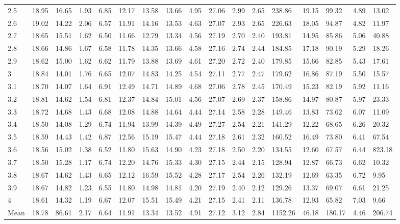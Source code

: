 \begin{adjustbox}{angle=90}
\begin{center}
\begin{tabular}{|l|llllllllllllllll|}
2.5&18.95&16.65&1.93&6.85&12.17&13.58&13.66&4.95&27.06&2.99&2.65&238.86&19.15&99.32&4.89&13.02  \\ 
2.6&19.02&14.22&2.06&6.57&11.91&14.16&13.53&4.63&27.07&2.93&2.65&226.63&18.05&94.87&4.82&11.97  \\ 
2.7&18.65&15.51&1.62&6.50&11.66&12.79&13.34&4.56&27.19&2.70&2.40&193.81&14.95&85.86&5.06&40.88  \\ 
2.8&18.66&14.86&1.67&6.58&11.78&14.35&13.66&4.58&27.16&2.74&2.44&184.85&17.18&90.19&5.29&18.26  \\ 
2.9&18.62&15.00&1.62&6.62&11.79&13.88&13.69&4.61&27.20&2.72&2.40&179.85&15.66&82.85&5.43&17.61  \\ 
3&18.84&14.01&1.76&6.65&12.07&14.83&14.25&4.54&27.11&2.77&2.47&179.62&16.86&87.19&5.50&15.57  \\ 
3.1&18.70&14.07&1.64&6.91&12.49&14.71&14.89&4.68&27.06&2.78&2.45&170.49&15.23&82.19&5.92&11.16  \\ 
3.2&18.81&14.62&1.54&6.81&12.37&14.84&15.01&4.56&27.07&2.69&2.37&158.86&14.97&80.87&5.97&23.33  \\ 
3.3&18.72&14.68&1.43&6.68&12.08&14.88&14.64&4.44&27.14&2.58&2.28&149.46&13.83&73.62&6.07&11.09  \\ 
3.4&18.50&14.08&1.29&6.74&11.94&13.99&14.39&4.49&27.27&2.54&2.21&141.29&12.22&68.65&6.26&20.32  \\ 
3.5&18.59&14.43&1.42&6.87&12.56&15.19&15.47&4.44&27.18&2.61&2.32&160.52&16.49&73.80&6.41&67.54  \\ 
3.6&18.56&15.02&1.38&6.52&11.80&15.63&14.90&4.23&27.18&2.50&2.20&134.55&12.60&67.57&6.44&823.18  \\ 
3.7&18.50&15.28&1.17&6.74&12.20&14.76&15.33&4.30&27.15&2.44&2.15&128.94&12.87&66.73&6.62&10.32  \\ 
3.8&18.67&14.62&1.43&6.65&12.12&16.59&15.52&4.28&27.17&2.54&2.26&132.19&12.69&63.35&6.72&9.95  \\ 
3.9&18.67&14.82&1.23&6.55&11.80&14.98&14.81&4.20&27.19&2.40&2.12&129.26&13.37&69.07&6.61&21.25  \\ 
4&18.61&14.32&1.19&6.67&12.07&15.51&15.49&4.21&27.15&2.41&2.11&136.78&12.93&65.82&7.03&9.66  \\ \hline \hline
Mean&18.78&86.61&2.17&6.64&11.91&13.34&13.52&4.91&27.12&3.12&2.84&1152.26&46.18&180.17&4.46&206.74  \\ \hline
\end{tabular}
\end{center}
\end{adjustbox}





